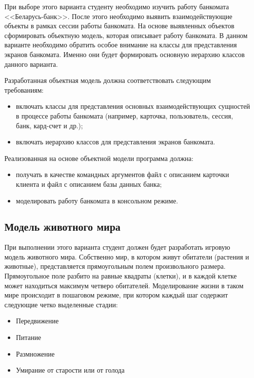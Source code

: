 \documentclass[a4paper,12pt]{article}
\begin{document}
При выборе этого варианта студенту необходимо изучить работу банкомата
<<Беларусь-банк>>. После этого необходимо выявить взаимодействующие
объекты в рамках сессии работы банкомата. На основе выявленных
объектов сформировать объектную модель, которая описывает работу
банкомата. В данном варианте необходимо обратить особое внимание на
классы для представления экранов банкомата. Именно они будет
формировать основную иерархию классов данного варианта.

Разработанная объектная модель должна соответствовать следующим требованиям: 

\begin{itemize}
\item включать классы для представления основных взаимодействующих
  сущностей в процессе работы банкомата (например, карточка,
  пользователь, сессия, банк, кард-счет и др.);
\item включать иерархию классов для представления экранов банкомата.
\end{itemize}

Реализованная на основе объектной модели программа должна: 

\begin{itemize}
\item получать в качестве командных аргументов файл с описанием
  карточки клиента и файл с описанием базы данных банка;
\item моделировать работу банкомата в консольном режиме.
\end{itemize}

\subsection{Модель животного мира}

При выполнении этого варианта студент должен будет разработать игровую
модель животного мира. Собственно мир, в котором живут обитатели
(растения и животные), представляется прямоугольным полем
произвольного размера. Прямоугольное поле разбито на равные квадраты
(клетки), и в каждой клетке может находиться максимум четверо
обитателей. Моделирование жизни в таком мире происходит в пошаговом
режиме, при котором каждый шаг содержит следующие четко выделенные
стадии:

\begin{itemize}
\item Передвижение
\item Питание
\item Размножение
\item Умирание от старости или от голода
\end{itemize}
\end{document}
